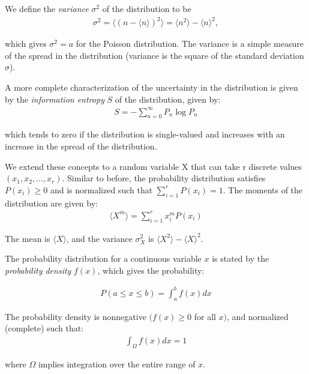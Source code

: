 \documentclass[book.tex]{subfiles}
\begin{document}
We define the \textit{variance} $\sigma^2$ of the distribution to be  
\begin{align}
\sigma^2=\langle \left( n - \langle n \rangle \right)^2 \rangle = \langle n^2 \rangle - \langle n \rangle ^2, 
\end{align}

which gives $\sigma^2 = a$ for the Poisson distribution. The variance is a simple measure of the spread in the distribution (variance is the square of the standard deviation $\sigma$).

A more complete characterization of the uncertainty in the distribution is given by the \textit{information entropy} $S$ of the distribution, given by:
\begin{align}\label{Eq16}
S = -\sum_{n=0}^{\infty}P_n \log P_n
\end{align}

\noindent which tends to zero if the distribution is single-valued and increases with an increase in the spread of the distribution.


We extend these concepts to a random variable X that can take r
discrete values $(x_1,x_2,...,x_r)$. Similar to before, the probability distribution satisfies $P(x_i) \geq 0$ and is normalized such that $\sum_{i=1}^r P(x_i)=1$. The moments of the distribution are given by:
\begin{align}\label{Eq17}
\langle X^m \rangle = \sum_{i=1}^r x_i^m P(x_i)
\end{align}

The mean is $\langle X \rangle$, and the variance $\sigma_X^2$ is $\langle X^2 \rangle - \langle X \rangle^2$. 

The probability distribution for a continuous variable $x$ is stated by the \textit{probability density} $f(x)$, which gives the probability:

\begin{align}
P(a\leq x \leq b) = \int_a^b f(x)dx 
\end{align}

The probability density is nonnegative $(f(x) \geq 0$ for all $x)$, and normalized (complete) such that:
\begin{align}
\int_\Omega f(x)dx = 1
\end{align}

\noindent where $\Omega$ implies integration over the entire range of $x$.

\end{document}
